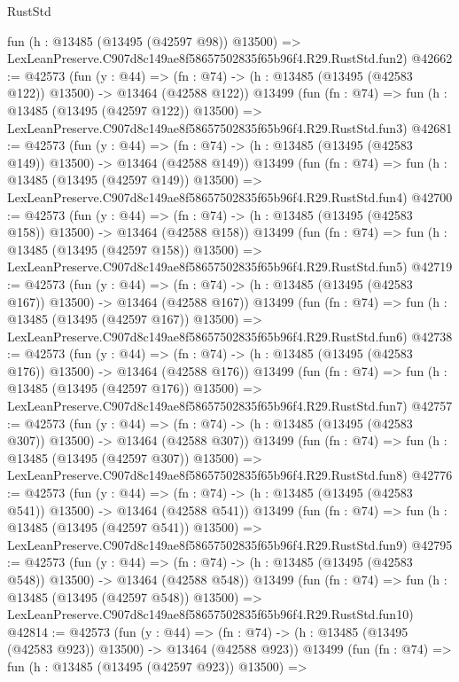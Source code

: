 \begin{lexlean}{RustStd}
\begin{coremodule}
    fun (h : @13485 (@13495 (@42597 @98)) @13500) =>
    LexLeanPreserve.C907d8c149ae8f58657502835f65b96f4.R29.RustStd.fun2)
@42662 := @42573
    (fun (y : @44) =>
    (fn : @74) -> (h : @13485 (@13495 (@42583 @122)) @13500) -> @13464 (@42588 @122))
    @13499
    (fun (fn : @74) =>
    fun (h : @13485 (@13495 (@42597 @122)) @13500) =>
    LexLeanPreserve.C907d8c149ae8f58657502835f65b96f4.R29.RustStd.fun3)
@42681 := @42573
    (fun (y : @44) =>
    (fn : @74) -> (h : @13485 (@13495 (@42583 @149)) @13500) -> @13464 (@42588 @149))
    @13499
    (fun (fn : @74) =>
    fun (h : @13485 (@13495 (@42597 @149)) @13500) =>
    LexLeanPreserve.C907d8c149ae8f58657502835f65b96f4.R29.RustStd.fun4)
@42700 := @42573
    (fun (y : @44) =>
    (fn : @74) -> (h : @13485 (@13495 (@42583 @158)) @13500) -> @13464 (@42588 @158))
    @13499
    (fun (fn : @74) =>
    fun (h : @13485 (@13495 (@42597 @158)) @13500) =>
    LexLeanPreserve.C907d8c149ae8f58657502835f65b96f4.R29.RustStd.fun5)
@42719 := @42573
    (fun (y : @44) =>
    (fn : @74) -> (h : @13485 (@13495 (@42583 @167)) @13500) -> @13464 (@42588 @167))
    @13499
    (fun (fn : @74) =>
    fun (h : @13485 (@13495 (@42597 @167)) @13500) =>
    LexLeanPreserve.C907d8c149ae8f58657502835f65b96f4.R29.RustStd.fun6)
@42738 := @42573
    (fun (y : @44) =>
    (fn : @74) -> (h : @13485 (@13495 (@42583 @176)) @13500) -> @13464 (@42588 @176))
    @13499
    (fun (fn : @74) =>
    fun (h : @13485 (@13495 (@42597 @176)) @13500) =>
    LexLeanPreserve.C907d8c149ae8f58657502835f65b96f4.R29.RustStd.fun7)
@42757 := @42573
    (fun (y : @44) =>
    (fn : @74) -> (h : @13485 (@13495 (@42583 @307)) @13500) -> @13464 (@42588 @307))
    @13499
    (fun (fn : @74) =>
    fun (h : @13485 (@13495 (@42597 @307)) @13500) =>
    LexLeanPreserve.C907d8c149ae8f58657502835f65b96f4.R29.RustStd.fun8)
@42776 := @42573
    (fun (y : @44) =>
    (fn : @74) -> (h : @13485 (@13495 (@42583 @541)) @13500) -> @13464 (@42588 @541))
    @13499
    (fun (fn : @74) =>
    fun (h : @13485 (@13495 (@42597 @541)) @13500) =>
    LexLeanPreserve.C907d8c149ae8f58657502835f65b96f4.R29.RustStd.fun9)
@42795 := @42573
    (fun (y : @44) =>
    (fn : @74) -> (h : @13485 (@13495 (@42583 @548)) @13500) -> @13464 (@42588 @548))
    @13499
    (fun (fn : @74) =>
    fun (h : @13485 (@13495 (@42597 @548)) @13500) =>
    LexLeanPreserve.C907d8c149ae8f58657502835f65b96f4.R29.RustStd.fun10)
@42814 := @42573
    (fun (y : @44) =>
    (fn : @74) -> (h : @13485 (@13495 (@42583 @923)) @13500) -> @13464 (@42588 @923))
    @13499
    (fun (fn : @74) =>
    fun (h : @13485 (@13495 (@42597 @923)) @13500) =>

\end{coremodule}
\end{lexlean}
